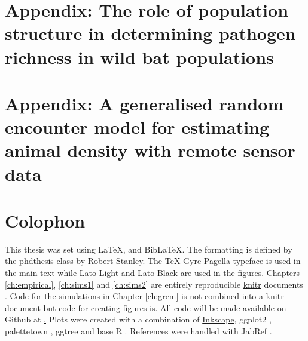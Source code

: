 



\appendix


\chapter{Appendix: The role of population structure in determining pathogen richness in wild bat populations}
\label{empirAppendix}




\chapter{Appendix: A generalised random encounter model for estimating animal density with remote sensor data}
\label{gremAppendix}




\chapter{Colophon}
\label{appendixlabel3}


This thesis was set using \LaTeX, \XeLaTeX\vspace{1mm} and Bib\LaTeX. \vspace{-0.12cm} 
The formatting is defined by the \href{https://github.com/robjstan/latex-phdthesis}{phdthesis} class by Robert Stanley.
The TeX Gyre Pagella typeface is used in the main text while { Lato Light} and { \color[rgb]{0.75,0.75,0.75} Lato Black} are used in the figures.
Chapters \ref{ch:empirical}, \ref{ch:sims1} and \ref{ch:sims2} are entirely reproducible \href{http://yihui.name/knitr/}{knitr} documents \cite{knitr}.
Code for the simulations in Chapter \ref{ch:grem} is not combined into a knitr document but code for creating figures is.
All code will be made available on Github at \href{https://github.com/timcdlucas/PhDThesis}. %
Plots were created with a combination of \href{www.inkscape.org}{Inkscape}, ggplot2 \cite{ggplot2}, palettetown \cite{palettetown}, ggtree \cite{ggtree} and base R \cite{R}.
References were handled with JabRef \cite{JabRef_software}. 

